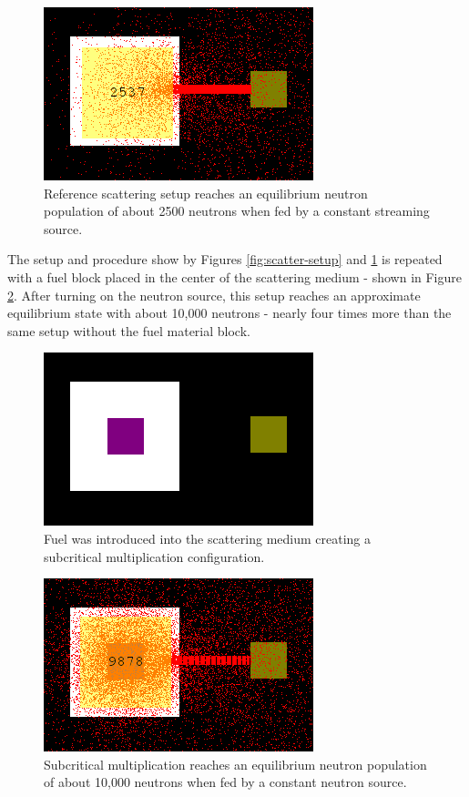 \documentclass{anstrans}
\begin{document}
\begin{figure}
    \centering
    \includegraphics{scatter-equil.png}
    \caption{Reference scattering setup reaches an equilibrium neutron population of about 2500 neutrons when fed by a constant streaming source.}
    \label{fig:scatter-equil}
\end{figure}

The setup and procedure show by Figures \ref{fig:scatter-setup} and
\ref{fig:scatter-equil} is repeated with a fuel block placed in the center of
the scattering medium - shown in Figure \ref{fig:subcrit-setup}.  After
turning on the neutron source, this setup reaches an approximate equilibrium
state with about 10,000 neutrons - nearly four times more than the same setup
without the fuel material block.

\begin{figure}
    \centering
    \includegraphics{subcrit-mult-setup.png}
    \caption{Fuel was introduced into the scattering medium creating a subcritical multiplication configuration.}
    \label{fig:subcrit-setup}
\end{figure}

\begin{figure}
    \centering
    \includegraphics{subcrit-mult-equil.png}
    \caption{Subcritical multiplication reaches an equilibrium neutron population of about 10,000 neutrons when fed by a constant neutron source.}
    \label{fig:subcrit-equil}
\end{figure}
\end{document}
